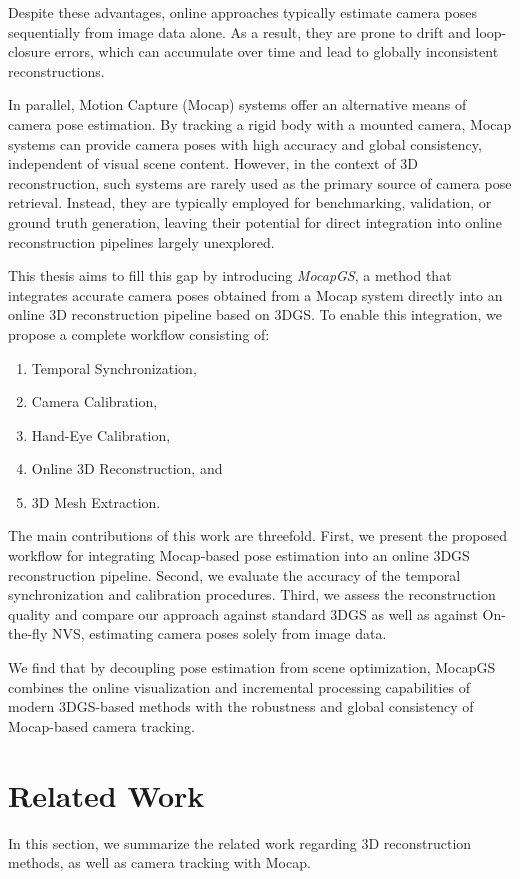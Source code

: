 \documentclass[a4paper,fleqn]{cas-dc}
\begin{document}
Despite these advantages, online approaches typically estimate camera poses sequentially from image data alone. As a result, they are prone to drift and loop-closure errors, which can accumulate over time and lead to globally inconsistent reconstructions.

In parallel, Motion Capture (Mocap) systems offer an alternative means of camera pose estimation. By tracking a rigid body with a mounted camera, Mocap systems can provide camera poses with high accuracy and global consistency, independent of visual scene content. However, in the context of 3D reconstruction, such systems are rarely used as the primary source of camera pose retrieval. Instead, they are typically employed for benchmarking, validation, or ground truth generation, leaving their potential for direct integration into online reconstruction pipelines largely unexplored.

This thesis aims to fill this gap by introducing \emph{MocapGS}, a method that integrates accurate camera poses obtained from a Mocap system directly into an online 3D reconstruction pipeline based on 3DGS. To enable this integration, we propose a complete workflow consisting of:
\begin{enumerate}
\itemsep=0pt
\item Temporal Synchronization,
\item Camera Calibration,
\item Hand-Eye Calibration,
\item Online 3D Reconstruction, and
\item 3D Mesh Extraction.
\end{enumerate}  

The main contributions of this work are threefold. First, we present the proposed workflow for integrating Mocap-based pose estimation into an online 3DGS reconstruction pipeline. Second, we evaluate the accuracy of the temporal synchronization and calibration procedures. Third, we assess the reconstruction quality and compare our approach against standard 3DGS as well as against On-the-fly NVS, estimating camera poses solely from image data.

We find that by decoupling pose estimation from scene optimization, MocapGS combines the online visualization and incremental processing capabilities of modern 3DGS-based methods with the robustness and global consistency of Mocap-based camera tracking. 

\section{Related Work}\label{sec:related_work}
In this section, we summarize the related work regarding 3D reconstruction methods, as well as camera tracking with Mocap.
\end{document}
